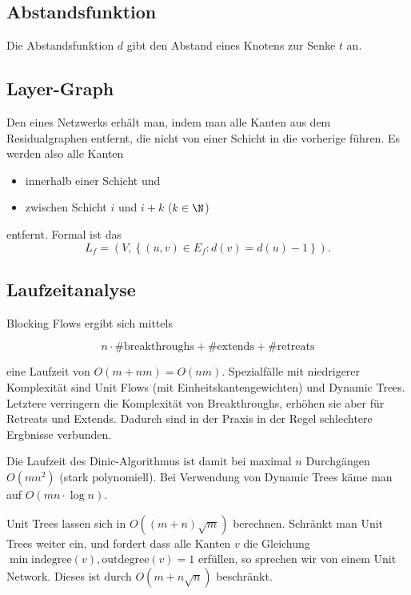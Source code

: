 \subsection{Abstandsfunktion}

Die Abstandsfunktion \( d \) gibt den Abstand eines Knotens zur Senke \( t \) an.

\subsection{Layer-Graph}

Den  eines Netzwerks erhält man, indem man alle Kanten aus dem Residualgraphen entfernt, die nicht von einer Schicht in die vorherige führen. Es werden also alle Kanten
\begin{itemize}
  \item innerhalb einer Schicht und
  \item zwischen Schicht \( i \) und \( i + k \) (\( k \in \N \))
\end{itemize}
entfernt. Formal ist das
\begin{equation*}
  L_f = (V, \left \{ (u,v) \in E_f : d(v) = d(u) - 1 \right \})\text{.}
\end{equation*}

\subsection{Laufzeitanalyse}

Blocking Flows ergibt sich mittels 

\begin{equation*}
	n \cdot \text{\#breakthroughs} + \text{\#extends} + \text{\#retreats}
\end{equation*}

eine Laufzeit von $O(m + nm) = O(nm)$.
Spezialfälle mit niedrigerer Komplexität sind Unit Flows (mit Einheitskantengewichten) und Dynamic Trees. Letztere verringern die Komplexität von Breakthroughs, erhöhen sie aber für Retreats und Extends. Dadurch sind in der Praxis in der Regel schlechtere Ergbnisse verbunden.

Die Laufzeit des Dinic-Algorithmus ist damit bei maximal $n$ Durchgängen \( O(mn^2) \) (stark polynomiell). Bei Verwendung von Dynamic Trees käme man auf $O(mn \cdot \log n)$.

Unit Trees lassen sich in $O((m+n)\sqrt{m})$ berechnen. Schränkt man Unit Trees weiter ein, und fordert dass alle Kanten $v$ die Gleichung $\min{\text{indegree}(v), \text{outdegree}(v)} = 1$ erfüllen, so sprechen wir von einem Unit Network. Dieses ist durch $O(m+n\sqrt{n})$ beschränkt.


